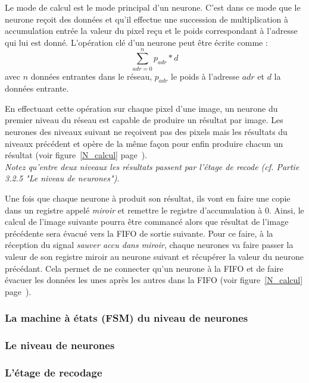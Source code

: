 	Le mode de calcul est le mode principal d'un neurone. C'est dans ce mode que le neurone 
	reçoit des données et qu'il effectue une succession de multiplication à accumulation entrée 
	la valeur du pixel reçu et le poids correspondant à l'adresse qui lui est donné. L'opération clé 
	d'un neurone peut être écrite comme :
	$$\sum_{adr=0}^n p_{adr}*d$$
	avec $n$ données entrantes dans le réseau, $p_{adr}$ le poids à l'adresse $adr$ 
	et $d$ la données entrante. 

	En effectuant cette opération sur chaque pixel d'une image, un neurone du premier niveau du réseau
	est capable de produire un résultat par image. Les neurones des niveaux suivant ne reçoivent 
	pas des pixels mais les résultats du niveaux précédent et opère de la même façon pour enfin 
	produire chacun un résultat (voir figure~\ref{N_calcul} page~\pageref{N_calcul}).
	\\{\em Notez qu'entre deux niveaux les résultats passent par l'étage de recode 
	(cf. Partie 3.2.5 "Le niveau de neurones")}.
	
	Une fois que chaque neurone à produit son résultat, ils vont en faire une copie dans 
	un registre appelé {\em miroir} et remettre le registre d'accumulation à 0. Ainsi, 
	le calcul de l'image suivante pourra être commancé alors que résultat de l'image précédente 
	sera évacué vers la FIFO de sortie suivante. Pour ce faire, à la réception du signal 
	{\em sauver accu dans miroir}, chaque neurones va faire passer la valeur de son 
	registre miroir au neurone suivant et récupérer la valeur du neurone précédant.
	Cela permet de ne connecter qu'un neurone à la FIFO 
	et de faire évacuer les données les unes après les autres dans la FIFO 
	(voir figure~\ref{N_calcul} page~\pageref{N_calcul}).
	
\subsubsection{La machine à états (FSM) du niveau de neurones}
\subsubsection{Le niveau de neurones}
\subsubsection{L'étage de recodage}

